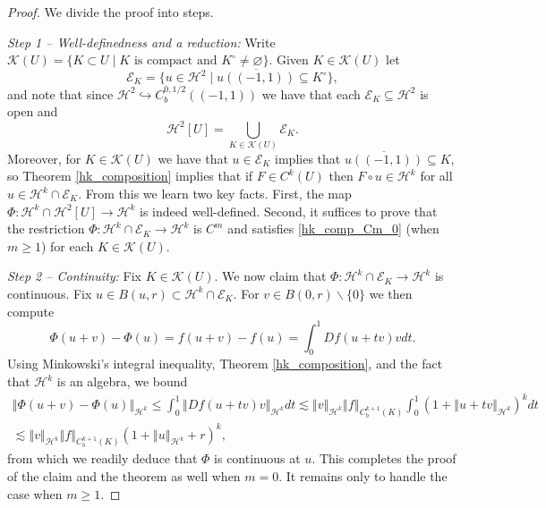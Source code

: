\documentclass[11pt,reqno]{amsart}
\numberwithin{equation}{section}
\providecommand{\norm}[1]{\left\Vert#1\right\Vert}
\def\ls{\lesssim}
\providecommand{\norm}[1]{\left\Vert#1\right\Vert}
\def\ls{\lesssim}
\def\h{\mathcal{H}}
\def\st{\;\vert\;}
\begin{document}
\begin{proof}
We divide the proof into steps.

\emph{Step 1 -- Well-definedness and a reduction:}   Write $\mathcal{K}(U) = \{ K \subset U \st K \text{ is compact and } K^\circ \neq \varnothing\}$.  Given $K \in \mathcal{K}(U)$ let 
\begin{equation}
 \mathcal{E}_K = \{u \in \h^2 \st \overline{u((-1,1))} \subseteq K^\circ \},
\end{equation}
and note that since $\h^2 \hookrightarrow C^{0,1/2}_b((-1,1))$ we have that each   $\mathcal{E}_K \subseteq \h^2$ is open  and 
\begin{equation}
 \h^2[U] = \bigcup_{K \in \mathcal{K}(U)} \mathcal{E}_K.
\end{equation}
Moreover, for $K \in \mathcal{K}(U)$ we have that $u \in \mathcal{E}_K$ implies that $\overline{u((-1,1))} \subseteq K$, so Theorem \ref{hk_composition} implies that if $F\in C^k(U)$ then  $F\circ u \in \h^k$ for all $u \in \h^k \cap \mathcal{E}_K$.  From this we learn two key facts.  First, the map $\Phi : \h^k \cap \h^2[U] \to \h^k $ is indeed well-defined.  Second, it suffices to prove that the restriction $\Phi : \h^k \cap \mathcal{E}_K \to \h^k$ is $C^m$ and satisfies \eqref{hk_comp_Cm_0} (when $m \ge 1$) for each $K \in \mathcal{K}(U)$.


\emph{Step 2 -- Continuity:}  Fix $K \in \mathcal{K}(U)$.   We now claim that $\Phi : \h^k \cap \mathcal{E}_K \to \h^k$ is continuous.  Fix $u \in B(u,r) \subset \h^k \cap \mathcal{E}_K$.   For $v \in B(0,r) \backslash \{0\}$ we then compute 
\begin{equation}
\Phi(u+v) - \Phi(u) = f(u+v) - f(u) = \int_0^1 Df(u+tv)v dt. 
\end{equation}
Using Minkowski's integral inequality,  Theorem \ref{hk_composition},  and the fact that $\h^k$ is an algebra, we bound
\begin{multline}
 \norm{\Phi(u+v) - \Phi(u)}_{\h^k} \le \int_0^1 \norm{Df(u+tv) v}_{\h^k} dt \ls \norm{v}_{\h^k} \norm{f}_{C^{k+1}_b(K)} \int_0^1 (1+ \norm{u+tv}_{\h^k})^k dt \\
 \ls  \norm{v}_{\h^k} \norm{f}_{C^{k+1}_b(K)} (1+ \norm{u}_{\h^k} + r)^k,
\end{multline}
from which we readily deduce that $\Phi$ is continuous at $u$.   This completes the proof of the claim and the theorem as well when $m=0$.  It remains only to handle the case when $m \ge 1$.





\end{proof}
\end{document}
